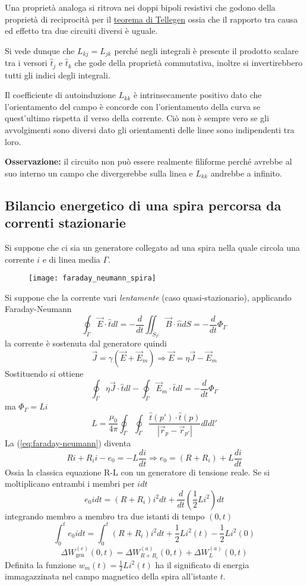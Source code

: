 Una proprietà analoga si ritrova nei doppi bipoli resistivi che godono della proprietà di
reciprocità per il \href{https://it.wikipedia.org/wiki/Teorema_di_Tellegen}{teorema di Tellegen} ossia che il rapporto tra causa ed effetto tra due circuiti diversi è uguale.

Si vede dunque che $L_{kj} = L_{jk}$ perché negli integrali è presente il prodotto
scalare tra i versori $\hat{t}_j$ e $\hat{t}_k$ che gode della proprietà commutativa,
inoltre si invertirebbero tutti gli indici degli integrali.

Il coefficiente di autoinduzione $L_{kk}$ è intrinsecamente positivo dato che 
l'orientamento del campo 
è concorde con l'orientamento della curva se quest'ultimo rispetta il verso della corrente.
Ciò non è sempre vero se gli avvolgimenti sono diversi dato gli orientamenti delle 
linee sono indipendenti tra loro.

\textbf{Osservazione:} il circuito non può essere realmente filiforme perché avrebbe al suo
interno un campo che divergerebbe sulla linea e $L_{kk}$ andrebbe a infinito.

\subsection{Bilancio energetico di una spira percorsa da correnti stazionarie}
Si suppone che ci sia un generatore collegato ad una spira nella quale circola una corrente
$i$ e di linea media $\Gamma$.
\begin{figure}[H]
\centering
\texttt{[image: faraday\_neumann\_spira]}
\end{figure}
Si suppone che la corrente vari \textit{lentamente} (caso quasi-stazionario), applicando Faraday-Neumann
$$
\oint_\Gamma \vec{E}\cdot\hat{t}dl = -\frac{d}{dt}\iint_{S_\Gamma}\vec{B}\cdot\hat{n}dS = 
-\frac{d}{dt}\Phi_\Gamma
$$
la corrente è sostenuta dal generatore quindi
$$
\vec{J} = \gamma(\vec{E}+\vec{E}_m) \Rightarrow \vec{E} = \eta \vec{J} - \vec{E}_m
$$
Sostituendo si ottiene
\begin{equation}
\oint_\Gamma \eta\vec{J}\cdot\hat{t}dl - \oint_\Gamma \vec{E}_m\cdot\hat{t}dl = - \frac{d}{dt} \Phi_\Gamma
\label{eq:faraday-neumann}
\end{equation}
ma $\Phi_\Gamma = Li$ 
$$
L = \frac{\mu_0}{4\pi}\oint_\Gamma\oint_\Gamma \frac{\hat{t}(p')\cdot\hat{t}(p)}{|\vec{r}_p-\vec{r}_{p'}|} dldl'
$$
La (\ref{eq:faraday-neumann}) diventa
$$
Ri + R_i i - e_0 = -L\frac{di}{dt} \Rightarrow e_0 = (R+R_i) + L\frac{di}{dt}
$$
Ossia la classica equazione R-L con un generatore di tensione reale.
Se si moltiplicano entrambi i membri per $i dt$
$$
e_0idt = (R+R_i) i^2 dt + \frac{d}{dt} \left(\frac{1}{2}Li^2\right)dt
$$
integrando membro a membro tra due istanti di tempo $(0,t)$
\begin{equation}
\int_0^t e_0 i dt = \int_0^t (R+R_i) i^2 dt + \frac{1}{2}Li^2(t) - \frac{1}{2} L i^2 (0)
\label{eq:bilancio_energia}
\end{equation}
$$
\Delta W^{(e)}_{\text{gen}} (0,t) = \Delta W^{(a)}_{R+R_i} (0,t) + \Delta W^{(a)}_L(0,t)
$$
Definita la funzione $w_m(t) = \frac{1}{2}Li^2(t)$ ha il significato di energia 
immagazzinata nel campo magnetico della spira all'istante $t$.

